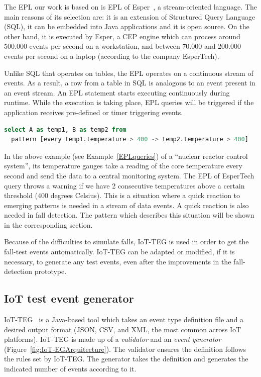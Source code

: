 \documentclass[review]{elsarticle}
\begin{document}
The EPL our work is based on is EPL of Esper~\cite{Esper:2016}, a stream-oriented language. The main reasons of its selection are: 
it is an extension of Structured Query Language (SQL), it can be embedded into Java applications and it is open source. On the other hand, it is executed by Esper, a
CEP engine which can process around 500.000 events per second on a workstation, and between 70.000 and 200.000 events per second on a laptop (according to 
the company EsperTech).
 
Unlike SQL that operates on tables, the EPL operates on a continuous stream of events. As a 
result, a row from a table in SQL is analogous to an event present in an event stream. An EPL statement starts executing continuously during 
runtime. While the execution is taking place, EPL queries will be triggered if the application receives pre-defined or timer triggering events.
 
 \renewcommand{\lstlistingname}{Example}
 
 \begin{lstlisting}[basicstyle=\ttfamily\footnotesize,language=SQL,caption=EPL of EsperTech query example,label=EPLqueries]
select A as temp1, B as temp2 from 
  pattern [every temp1.temperature > 400 -> temp2.temperature > 400]
 \end{lstlisting}
 
In the above example (see Example~\ref{EPLqueries}) of a ``nuclear
reactor control system'', its temperature gauges take a reading of the core temperature every second and send the data 
to a central monitoring system. The EPL of EsperTech query throws a warning if we have 2 consecutive 
temperatures above a certain threshold (400 degrees Celsius). This is a situation where a quick reaction to emerging patterns 
is needed in a stream of data events. A quick reaction is also needed in fall detection. The pattern which 
describes this situation will be shown in the corresponding section.
 
Because of the difficulties to simulate falls, IoT-TEG is used in
order to get the fall-test events automatically. 
IoT-TEG can be adapted or modified, if it is necessary, to generate any test events, even after the improvements 
in the fall-detection prototype.

\subsection{IoT test event generator}
\label{iotteg}

IoT-TEG~\cite{TesisGutierrez2017,Gutierrez2017} is a Java-based tool which takes an event 
type definition file and a desired output format (JSON, CSV, and XML, the most common across 
IoT platforms). IoT-TEG is made up of a \emph{validator} and an \emph{event generator} 
(Figure~\ref{fig:IoT-EGArquitecture}). The validator ensures the definition follows the rules set 
by IoT-TEG. The generator takes the definition and generates the indicated number of events according to it.
\end{document}
